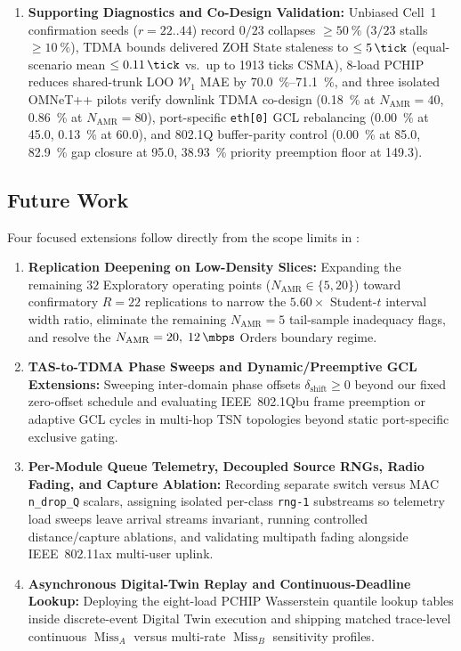 \documentclass[11pt,a4paper]{article}
\newcommand{\Namr}{\ensuremath{N_{\mathrm{AMR}}}}
\newcommand{\MissA}{\ensuremath{\operatorname{Miss}_A}}
\newcommand{\MissB}{\ensuremath{\operatorname{Miss}_B}}
\newcommand{\Wone}{\ensuremath{\mathcal{W}_1}}
\begin{document}
\begin{enumerate}[leftmargin=1.8em]
    \item \textbf{Supporting Diagnostics and Co-Design Validation:} Unbiased Cell~1 confirmation seeds ($r=22..44$) record $0/23$ collapses $\ge \qty{50}{\percent}$ ($3/23$ stalls $\ge \qty{10}{\percent}$), TDMA bounds delivered ZOH State staleness to $\le \qty{5}{\tick}$ (equal-scenario mean $\le \qty{0.11}{\tick}$ vs.\ up to \num{1913} ticks CSMA), 8-load PCHIP reduces shared-trunk LOO $\Wone$ MAE by \qtyrange{70.0}{71.1}{\percent}, and three isolated OMNeT++ pilots verify downlink TDMA co-design (\qty{0.18}{\percent} at $\Namr=40$, \qty{0.86}{\percent} at $\Namr=80$), port-specific \texttt{eth[0]} GCL rebalancing (\qty{0.00}{\percent} at \qty{45.0}{\mbps}, \qty{0.13}{\percent} at \qty{60.0}{\mbps}), and 802.1Q buffer-parity control (\qty{0.00}{\percent} at \qty{85.0}{\mbps}, \qty{82.9}{\percent} gap closure at \qty{95.0}{\mbps}, \qty{38.93}{\percent} priority preemption floor at \qty{149.3}{\mbps}).
\end{enumerate}

\subsection{Future Work}
\label{sec:future_work}

Four focused extensions follow directly from the scope limits in :
\begin{enumerate}[leftmargin=2.0em]
    \item \textbf{Replication Deepening on Low-Density Slices:} Expanding the remaining $32$ Exploratory operating points ($\Namr \in \{5, 20\}$) toward confirmatory $R=22$ replications to narrow the $5.60\times$ Student-$t$ interval width ratio, eliminate the remaining $\Namr=5$ tail-sample inadequacy flags, and resolve the $\Namr=20,\; \qty{12}{\mbps}$ Orders boundary regime.
    \item \textbf{TAS-to-TDMA Phase Sweeps and Dynamic/Preemptive GCL Extensions:} Sweeping inter-domain phase offsets $\delta_{\mathrm{shift}} \ge 0$ beyond our fixed zero-offset schedule and evaluating IEEE~802.1Qbu frame preemption or adaptive GCL cycles in multi-hop TSN topologies beyond static port-specific exclusive gating.
    \item \textbf{Per-Module Queue Telemetry, Decoupled Source RNGs, Radio Fading, and Capture Ablation:} Recording separate switch versus MAC \texttt{n\_drop\_Q} scalars, assigning isolated per-class \texttt{rng-1} substreams so telemetry load sweeps leave arrival streams invariant, running controlled distance/capture ablations, and validating multipath fading alongside IEEE~802.11ax multi-user uplink.
    \item \textbf{Asynchronous Digital-Twin Replay and Continuous-Deadline Lookup:} Deploying the eight-load PCHIP Wasserstein quantile lookup tables inside discrete-event Digital Twin execution and shipping matched trace-level continuous $\MissA$ versus multi-rate $\MissB$ sensitivity profiles.
\end{enumerate}
\end{document}
